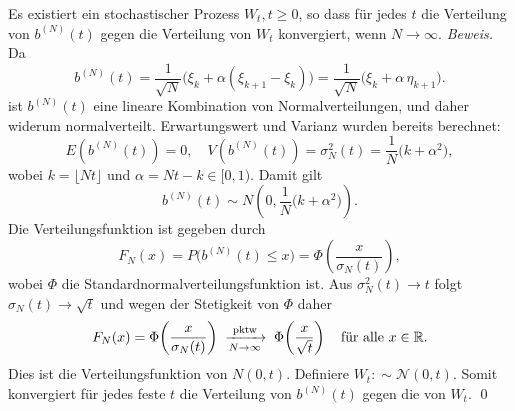 \begin{lemma}
Es existiert ein stochastischer Prozess $W_t, t \geq 0$, so dass für jedes $t$ die Verteilung von $b^{(N)}(t)$ gegen die Verteilung von $W_t$ konvergiert, wenn $N \to \infty$.
\textit{Beweis.}
Da 
$$b^{(N)}(t) = \frac{1}{\sqrt{N}}\big(\xi_k+\alpha(\xi_{k+1}-\xi_k)\big)
=\frac{1}{\sqrt{N}}\big(\xi_k+\alpha\,\eta_{k+1}\big).
$$
ist $b^{(N)}(t)$ eine lineare Kombination von Normalverteilungen, und daher widerum 
normalverteilt. Erwartungswert und Varianz wurden bereits berechnet:
$$
E(b^{(N)}(t)) = 0, \quad V(b^{(N)}(t)) = \sigma_N^2(t) = \frac{1}{N}\big(k+\alpha^2\big),
$$
wobei $k=\lfloor Nt \rfloor$ und $\alpha=Nt-k\in[0,1)$. Damit gilt
$$
b^{(N)}(t) \sim N\left(0,\frac{1}{N}\big(k+\alpha^2\big)\right).
$$
Die Verteilungsfunktion ist gegeben durch
$$
F_N(x)=P\big(b^{(N)}(t)\le x\big)=\Phi\!\left(\frac{x}{\sigma_N(t)}\right),
$$
wobei $\Phi$ die Standardnormalverteilungsfunktion ist. Aus $\sigma_N^2(t)\to t$ folgt $\sigma_N(t)\to \sqrt{t}$ und wegen der Stetigkeit von $\Phi$ daher
$$
F_N(x)=\Phi\!\left(\frac{x}{\sigma_N(t)}\right)\; \xrightarrow[N \to \infty]{\mathrm{pktw}} \;\Phi\!\left(\frac{x}{\sqrt{t}}\right)\quad\text{für alle }x\in\Bbb R.
$$
Dies ist die Verteilungsfunktion von $N(0,t)$. Definiere $W_t :\sim \mathcal N(0,t)$. Somit konvergiert für jedes feste $t$ die Verteilung von $b^{(N)}(t)$ gegen die von $W_t$. 
\qed
\end{lemma}

